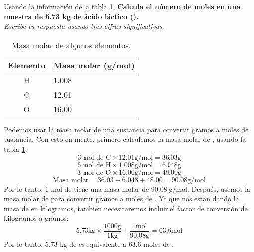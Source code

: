 \begin{multicols}{2}
    Usando la información de la tabla \ref{tab:q001},
    \textbf{Calcula el número de moles en una muestra de 5.73 kg de ácido láctico ().}\\
    \emph{Escribe tu respuesta usando tres cifras significativas.}

    \begin{table}[H]
        \centering
        \caption{Masa molar de algunos elementos.}
        \label{tab:q001}
        \begin{tabular}{c|p{2.2cm}}
            \textbf{Elemento} & \textbf{Masa molar (g/mol)} \\\midrule
            H                 & 1.008                       \\\hline
            C                 & 12.01                       \\\hline
            O                 & 16.00                       \\\hline
            \bottomrule
        \end{tabular}
    \end{table}
\end{multicols}

\begin{solutionbox}{8cm}
    Podemos usar la masa molar de una sustancia para convertir gramos a moles de sustancia. Con esto en mente, primero calculemos la masa molar de , usando la tabla \ref{tab:q001}:
    \[3 \text{ mol de C} \times 12.01 \text{g/mol} = 36.03 \text{g}\]
    \[6 \text{ mol de H} \times 1.008 \text{g/mol} = 6.048 \text{g}\]
    \[3 \text{ mol de O} \times 16.00 \text{g/mol} = 48.00 \text{g}\]
    \[\text{Masa molar} = 36.03 + 6.048 + 48.00 = 90.08 \text{g/mol}\]
    Por lo tanto, 1 mol de  tiene una masa molar de 90.08 g/mol.
    Después, usemos la masa molar de  para convertir gramos a moles de .
    Ya que nos estan dando la masa de  en kilogramos, también necesitaremos incluir el factor de conversión de kilogramos a gramos:
    \[5.73 \text{kg} \times \frac{1000 \text{g}}{1 \text{kg}} \times \frac{1 \text{mol}}{90.08 \text{g}} = 63.6 \text{mol}\]
    Por lo tanto, 5.73 kg de  es equivalente a 63.6 moles de .
\end{solutionbox}